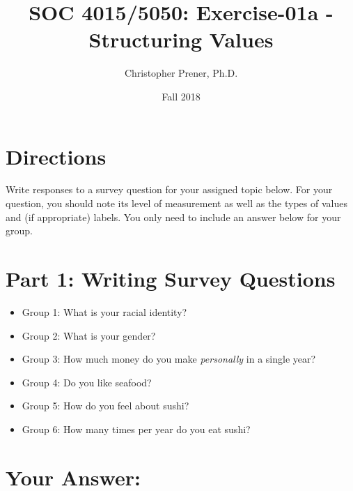 \documentclass{tufte-handout}
\title{SOC 4015/5050: Exercise-01a - Structuring Values}
\author{Christopher Prener, Ph.D.}
\date{Fall 2018}
\begin{document}
\maketitle %

\vspace{5mm}
\section{Directions}
Write responses to a survey question for your assigned topic below. For your question, you should note its level of measurement as well as the types of values and (if appropriate) labels. You only need to include an answer below for your group. 

\vspace{5mm}
\section{Part 1: Writing Survey Questions}
\begin{itemize}
\item Group 1: What is your racial identity?
\item Group 2: What is your gender?
\item Group 3: How much money do you make \textit{personally} in a single year?
\item Group 4: Do you like seafood?
\item Group 5: How do you feel about sushi?
\item Group 6: How many times per year do you eat sushi?
\end{itemize}

\vspace{5mm}
\section{Your Answer:}

\end{document}
